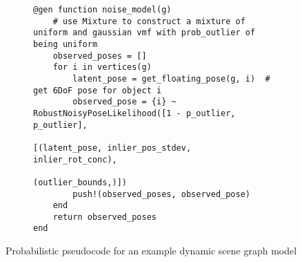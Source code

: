 \begin{figure}[H]
\begin{subfigure}{\textwidth}
\begin{lstlisting}
@gen function noise_model(g)
    # use Mixture to construct a mixture of uniform and gaussian vmf with prob_outlier of being uniform
    observed_poses = []
    for i in vertices(g)
        latent_pose = get_floating_pose(g, i)  # get 6DoF pose for object i
        observed_pose = {i} ~ RobustNoisyPoseLikelihood([1 - p_outlier, p_outlier],
                                                        [(latent_pose, inlier_pos_stdev, inlier_rot_conc),
                                                        (outlier_bounds,)])
        push!(observed_poses, observed_pose)
    end
    return observed_poses
end
\end{lstlisting}
\end{subfigure}

\caption{Probabilistic pseudocode for an example dynamic scene graph model}
\label{fig:model}
\end{figure}

